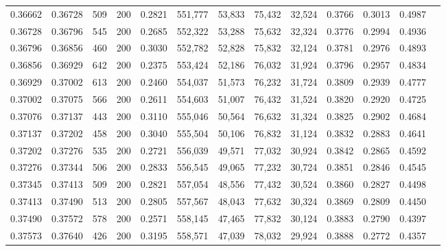 \begin{tabular}{rrrrrrrrrrrrr}
0.36662 & 0.36728 &   509 & 200 &                                     0.2821 & 551,777 &  53,833 &  75,432 &  32,524 & 0.3766 & 0.3013 & 0.4987 \\
0.36728 & 0.36796 &   545 & 200 &                                     0.2685 & 552,322 &  53,288 &  75,632 &  32,324 & 0.3776 & 0.2994 & 0.4936 \\
0.36796 & 0.36856 &   460 & 200 &                                     0.3030 & 552,782 &  52,828 &  75,832 &  32,124 & 0.3781 & 0.2976 & 0.4893 \\
0.36856 & 0.36929 &   642 & 200 &                                     0.2375 & 553,424 &  52,186 &  76,032 &  31,924 & 0.3796 & 0.2957 & 0.4834 \\
0.36929 & 0.37002 &   613 & 200 &                                     0.2460 & 554,037 &  51,573 &  76,232 &  31,724 & 0.3809 & 0.2939 & 0.4777 \\
0.37002 & 0.37075 &   566 & 200 &                                     0.2611 & 554,603 &  51,007 &  76,432 &  31,524 & 0.3820 & 0.2920 & 0.4725 \\
0.37076 & 0.37137 &   443 & 200 &                                     0.3110 & 555,046 &  50,564 &  76,632 &  31,324 & 0.3825 & 0.2902 & 0.4684 \\
0.37137 & 0.37202 &   458 & 200 &                                     0.3040 & 555,504 &  50,106 &  76,832 &  31,124 & 0.3832 & 0.2883 & 0.4641 \\
0.37202 & 0.37276 &   535 & 200 &                                     0.2721 & 556,039 &  49,571 &  77,032 &  30,924 & 0.3842 & 0.2865 & 0.4592 \\
0.37276 & 0.37344 &   506 & 200 &                                     0.2833 & 556,545 &  49,065 &  77,232 &  30,724 & 0.3851 & 0.2846 & 0.4545 \\
0.37345 & 0.37413 &   509 & 200 &                                     0.2821 & 557,054 &  48,556 &  77,432 &  30,524 & 0.3860 & 0.2827 & 0.4498 \\
0.37413 & 0.37490 &   513 & 200 &                                     0.2805 & 557,567 &  48,043 &  77,632 &  30,324 & 0.3869 & 0.2809 & 0.4450 \\
0.37490 & 0.37572 &   578 & 200 &                                     0.2571 & 558,145 &  47,465 &  77,832 &  30,124 & 0.3883 & 0.2790 & 0.4397 \\
0.37573 & 0.37640 &   426 & 200 &                                     0.3195 & 558,571 &  47,039 &  78,032 &  29,924 & 0.3888 & 0.2772 & 0.4357 \\

\end{tabular}
